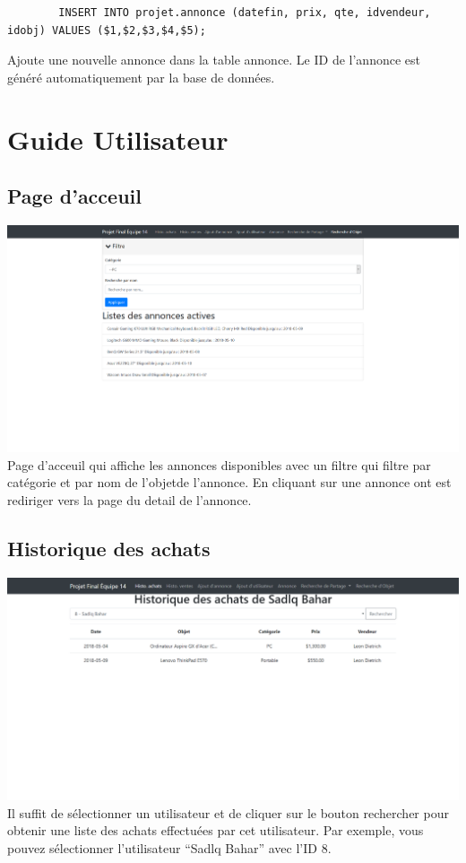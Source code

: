 \documentclass[a4paper,12pt]{article}
\begin{document}
\begin{spacing}{1}
    \begin{verbatim}
        INSERT INTO projet.annonce (datefin, prix, qte, idvendeur, idobj) VALUES ($1,$2,$3,$4,$5);
    \end{verbatim}
    Ajoute une nouvelle annonce dans la table annonce. Le ID de l'annonce est généré automatiquement par la base de données.

	\section*{Guide Utilisateur}
	\subsection*{Page d'acceuil}
	\includegraphics[scale=0.3]{index.png}
	Page d'acceuil qui affiche les annonces disponibles avec un filtre qui filtre par catégorie et par nom de l'objetde l'annonce. En cliquant sur une annonce ont est rediriger vers la page du detail de l'annonce.
	\subsection*{Historique des achats}
	\includegraphics[scale=0.4]{historique_achats.png}
Il suffit de sélectionner un utilisateur et de cliquer sur le bouton rechercher pour obtenir une liste des achats effectuées par cet utilisateur. Par exemple, vous pouvez sélectionner l'utilisateur ``Sadlq Bahar'' avec l'ID 8.

\end{spacing}
\end{document}

